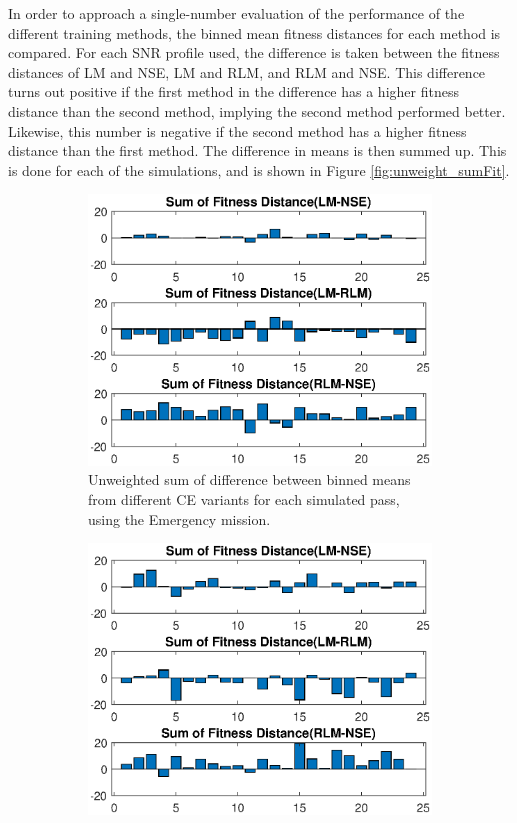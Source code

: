 \par In order to approach a single-number evaluation of the performance of the different training methods, the binned mean fitness distances for each method is compared. For each SNR profile used, the difference is taken between the fitness distances of  LM and NSE, LM and RLM, and RLM and NSE. This difference turns out positive if the first method in the difference has a higher fitness distance than the second method, implying the second method performed better. Likewise, this number is negative if the second method has a higher fitness distance than the first method. The difference in means is then summed up. This is done for each of the simulations, and is shown in Figure \ref{fig:unweight_sumFit}.
\begin{figure}[ht]
\begin{subfigure}{0.55\linewidth}
	\centering
	\includegraphics[scale=0.6]{figures/c_sim_results/emer_unweighted_sumFitness.eps}
	\caption{Unweighted sum of difference between binned means from different CE variants for each simulated pass, using the Emergency mission.}
	\label{fig:cSimUnweightEmer}
\end{subfigure}%
\begin{subfigure}{0.55\linewidth}
	\centering
	\includegraphics[scale=0.6]{figures/c_sim_results/coop_unweighted_sumFitness.eps}

\end{subfigure}
\end{figure}
